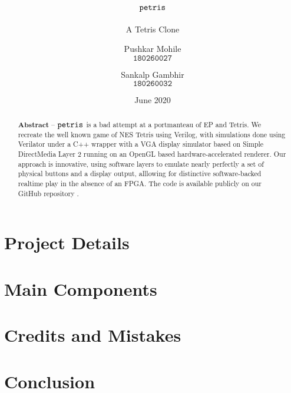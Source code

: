 \documentclass[10pt, a4paper, egregdoesnotlikesansseriftitles]{scrartcl}
\title{$\texttt{petris}$}
\subtitle{A Tetris Clone}
\author{
    Pushkar Mohile \\
    $\texttt{180260027}$
    \and
    Sankalp Gambhir \\
    $\texttt{180260032}$
    }
\date{June 2020}
\begin{document}
\maketitle

\begin{abstract}
    \centering
    $\textbf{Abstract --}$
    $\texttt{petris}$ is a bad attempt at a portmanteau of 
    EP and Tetris. We recreate the well known game of NES Tetris \cite{tetris}
    using Verilog, with simulations done using Verilator \cite{verilator} under
    a C++ wrapper with a VGA display simulator based on Simple DirectMedia Layer 2
    \cite{sdl2} running on an OpenGL based hardware-accelerated renderer. Our approach
    is innovative, using software layers to emulate nearly perfectly a set of
    physical buttons and a display output, alllowing for distinctive software-backed
    realtime play in the absence of an FPGA. The code is available publicly on our 
    GitHub repository \cite{petrisgit}.

\end{abstract}

  
\section{Project Details}


\section{Main Components}



\section{Credits and Mistakes}


\section{Conclusion}




\end{document}
